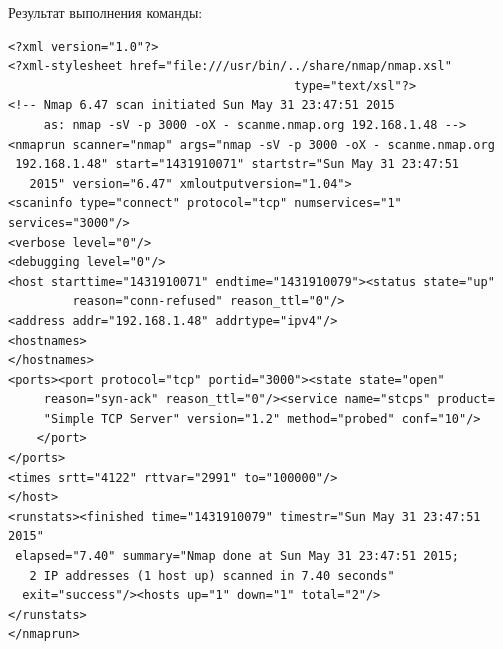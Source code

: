 \documentclass[a4paper, 14pt]{article}				%
\begin{document}
Результат выполнения команды:
\begin{Verbatim}[frame=single]
<?xml version="1.0"?>
<?xml-stylesheet href="file:///usr/bin/../share/nmap/nmap.xsl"
                                        type="text/xsl"?>
<!-- Nmap 6.47 scan initiated Sun May 31 23:47:51 2015
     as: nmap -sV -p 3000 -oX - scanme.nmap.org 192.168.1.48 -->
<nmaprun scanner="nmap" args="nmap -sV -p 3000 -oX - scanme.nmap.org
 192.168.1.48" start="1431910071" startstr="Sun May 31 23:47:51
   2015" version="6.47" xmloutputversion="1.04">
<scaninfo type="connect" protocol="tcp" numservices="1" services="3000"/>
<verbose level="0"/>
<debugging level="0"/>
<host starttime="1431910071" endtime="1431910079"><status state="up"
         reason="conn-refused" reason_ttl="0"/>
<address addr="192.168.1.48" addrtype="ipv4"/>
<hostnames>
</hostnames>
<ports><port protocol="tcp" portid="3000"><state state="open"
     reason="syn-ack" reason_ttl="0"/><service name="stcps" product=
     "Simple TCP Server" version="1.2" method="probed" conf="10"/>
    </port>
</ports>
<times srtt="4122" rttvar="2991" to="100000"/>
</host>
<runstats><finished time="1431910079" timestr="Sun May 31 23:47:51 2015"
 elapsed="7.40" summary="Nmap done at Sun May 31 23:47:51 2015;
   2 IP addresses (1 host up) scanned in 7.40 seconds"
  exit="success"/><hosts up="1" down="1" total="2"/>
</runstats>
</nmaprun>
\end{Verbatim}
\end{document}
